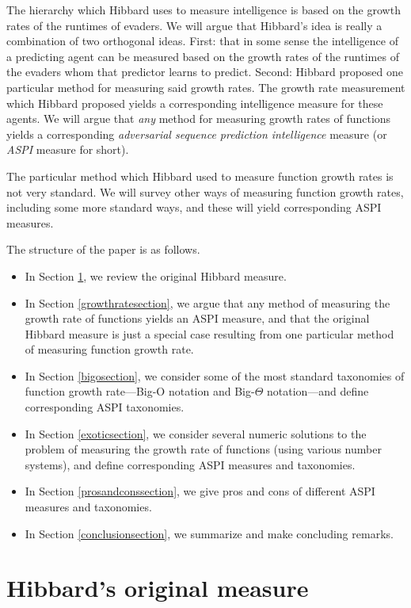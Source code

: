 \documentclass{article}
\begin{document}
The hierarchy which Hibbard uses to measure intelligence is based on the growth
rates of the runtimes of evaders.
We will argue that Hibbard's idea is really a combination of two
orthogonal ideas. First: that in some sense the intelligence of a predicting agent
can be measured based on the growth rates of the runtimes of the evaders whom that
predictor learns to predict. Second: Hibbard proposed one particular method for
measuring said growth rates. The growth rate measurement which Hibbard proposed yields
a corresponding intelligence measure for these agents. We will argue that \emph{any}
method for measuring growth rates of functions yields a corresponding
\emph{adversarial sequence prediction intelligence} measure (or \emph{ASPI} measure
for short).

The particular method which Hibbard used to measure function growth rates is
not very standard. We will survey other
ways of measuring function growth rates, including some more standard ways,
and these will yield corresponding ASPI measures.

The structure of the paper is as follows.
\begin{itemize}
    \item
    In Section \ref{originalmeasuresection}, we review the original Hibbard measure.
    \item
    In Section \ref{growthratesection}, we argue that any method of measuring
    the growth rate of functions yields an ASPI measure,
    and that the original Hibbard measure is just a special case resulting from
    one particular method of measuring function growth rate.
    \item
    In Section \ref{bigosection}, we consider some of the
    most standard taxonomies of
    function growth rate---Big-O notation and Big-$\Theta$ notation---and define
    corresponding ASPI taxonomies.
    \item
    In Section \ref{exoticsection}, we consider several numeric solutions to
    the problem of measuring the growth rate of functions (using various number
    systems), and define
    corresponding ASPI measures and taxonomies.
    \item
    In Section \ref{prosandconssection}, we give pros and cons of different
    ASPI measures and taxonomies.
    \item
    In Section \ref{conclusionsection}, we summarize and make concluding remarks.
\end{itemize}

\section{Hibbard's original measure}
\label{originalmeasuresection}
\end{document}
